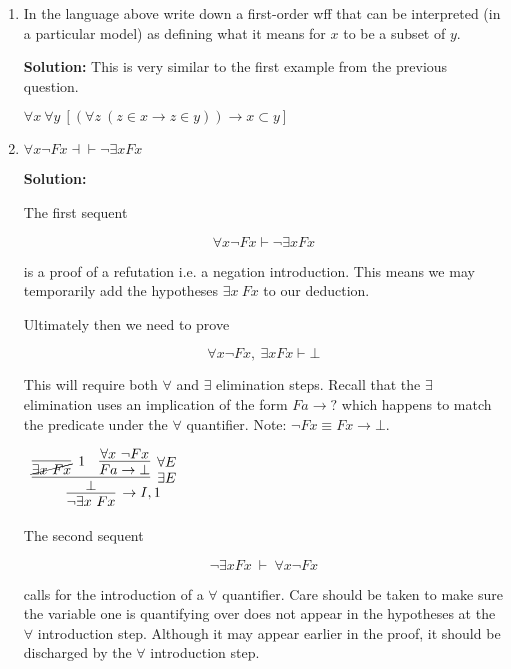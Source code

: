 \documentclass[11pt]{report}
\begin{document}
\begin{enumerate}
	

	\item In the language above write down a first-order wff that can be interpreted (in a particular model) as defining what it means for $x$ to be a subset of $y$. 

	{\bf Solution:} This is very similar to the first example from the previous question. 

	$\forall x \ \forall y \ [(\forall z \ (z \in x \to z \in y)) \rightarrow x \subset y]$

	\newpage
	\item $\forall x \neg Fx \dashv \vdash  \neg \exists x Fx$
	
	{\bf Solution:}

	The first sequent 

	$$\forall x \neg Fx \vdash  \neg \exists x Fx$$

	is a proof of a refutation i.e. a negation introduction. This means we may temporarily add the hypotheses $\exists x \ Fx$ to our deduction. 

	Ultimately then we need to prove 

	$$\forall x \neg Fx, \ \exists x Fx \vdash  \bot$$

	This will require both $\forall$ and $\exists$ elimination steps. Recall that the $\exists$ elimination uses an implication of the form $Fa \to ?$ which happens to match the predicate under the $\forall$ quantifier. Note: $\lnot Fx \equiv Fx \to \bot$.
			
					\begin{mdframed}
						\begin{center}
							$\begin{array}{c}
								\infer[\to I,1]{\lnot \exists x \ Fx}
									{\infer[\exists E]{\bot}
										{\infer[1]{\cancel{\exists x \ Fx}}{}
										&
										\infer[\forall E]{Fa \to \bot}{\forall x \ \lnot Fx}}}
							\end{array}$
						\end{center}
					\end{mdframed}

	The second sequent 

	$$\neg \exists x Fx \ \vdash \ \forall x \neg Fx$$		
	
	calls for the introduction of a $\forall$ quantifier. Care should be taken to make sure the variable one is quantifying over does not appear in the hypotheses at the $\forall$ introduction step. Although it may appear earlier in the proof, it should be discharged by the $\forall$ introduction step. 


\end{enumerate}
\end{document}
